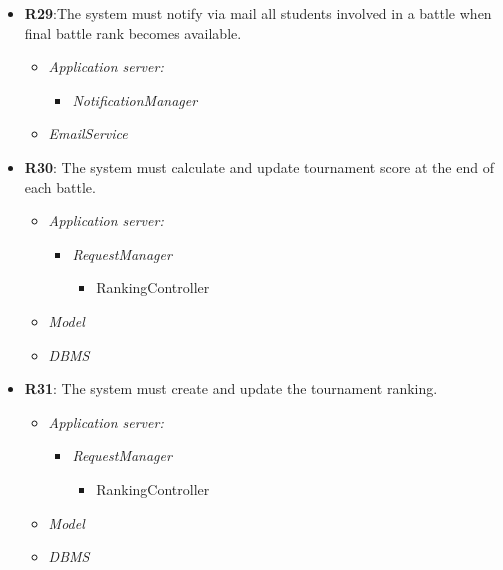 \begin{itemize}
         \item \textbf{R29}:The system must notify via mail all students involved in a battle when final battle rank becomes
available.
\begin{itemize}
                 \item \textit{Application server:}\begin{itemize}
                     \item \textit{NotificationManager}
                 \end{itemize}
                \item \textit{EmailService}
                \end{itemize}
        
        \item \textbf{R30}: The system must calculate and update tournament score at the end of each battle.
            \begin{itemize}
            \item \textit{Application server:}
            \begin{itemize}
                 \item \textit{RequestManager} \begin{itemize}
                     \item RankingController
                 \end{itemize}
            \end{itemize}
            \item \textit{Model}
            \item \textit{DBMS}
                \end{itemize}

            \item \textbf{R31}: The system must create and update the tournament ranking.
              \begin{itemize}
            \item \textit{Application server:}
            \begin{itemize}
                 \item \textit{RequestManager} \begin{itemize}
                     \item RankingController
                 \end{itemize}
            \end{itemize}
            \item \textit{Model}
            \item \textit{DBMS}
                \end{itemize}



\end{itemize}
